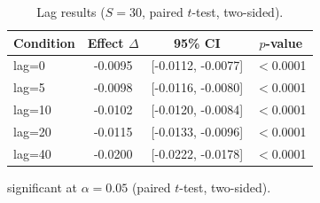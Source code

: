 \begin{table}[t]
  \centering
  \caption{Lag results ($S=30$, paired $t$-test, two-sided).}
  \label{tab:lag}
  \begin{tabular}{lccc}
    \toprule
    Condition & Effect $\Delta$ & 95\% CI & $p$-value \\
    \midrule
    lag=0 & -0.0095\dag{} & [-0.0112, -0.0077] & $<$0.0001 \\
    lag=5 & -0.0098\dag{} & [-0.0116, -0.0080] & $<$0.0001 \\
    lag=10 & -0.0102\dag{} & [-0.0120, -0.0084] & $<$0.0001 \\
    lag=20 & -0.0115\dag{} & [-0.0133, -0.0096] & $<$0.0001 \\
    lag=40 & -0.0200\dag{} & [-0.0222, -0.0178] & $<$0.0001 \\
    \bottomrule
  \end{tabular}
  \begin{minipage}{\linewidth}
    \vspace{4pt}
    \footnotesize \dag{} significant at $\alpha = 0.05$ (paired $t$-test, two-sided).
  \end{minipage}
\end{table}